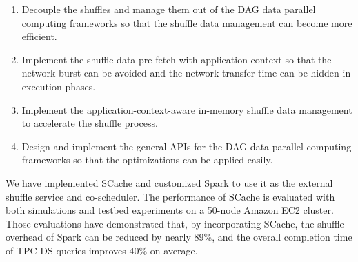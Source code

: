\begin{englishabstract}
\begin{enumerate}
    \item Decouple the shuffles and manage them out of the DAG data parallel computing frameworks so that the shuffle data management can become more efficient.
    \item Implement the shuffle data pre-fetch with application context so that the network burst can be avoided and the network transfer time can be hidden in execution phases.
    \item Implement the application-context-aware in-memory shuffle data management to accelerate the shuffle process.
    \item Design and implement the general APIs for the DAG data parallel computing frameworks so that the optimizations can be applied easily.
\end{enumerate}

We have implemented SCache and customized Spark to use it as the external shuffle service and co-scheduler. 
The performance of SCache is evaluated with both simulations and testbed experiments on a 50-node Amazon EC2 cluster.
Those evaluations have demonstrated that, by incorporating SCache, the shuffle overhead of Spark can be reduced by nearly 89\%, 
and the overall completion time of TPC-DS queries improves 40\% on average.


\end{englishabstract}


